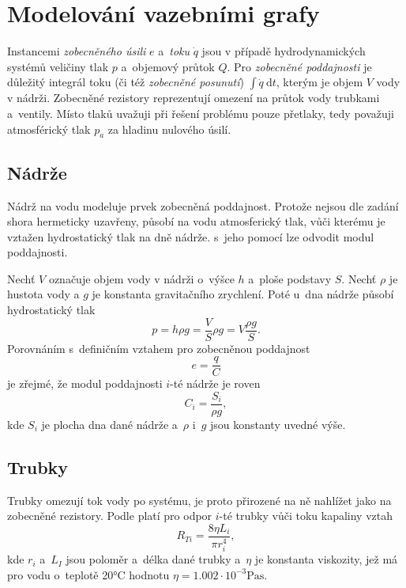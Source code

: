 \documentclass[conference]{IEEEtran}
\begin{document}
\section{Modelování vazebními grafy}

Instancemi \textit{zobecněného úsili} $e$ a~\textit{toku} $\dot{q}$ jsou v případě hydrodynamických systémů veličiny tlak $p$ a~objemový průtok $Q$.
Pro \textit{zobecněné poddajnosti} je důležitý integrál toku (či též \textit{zobecněné posunutí}) $\int \dot{q}~\text{d}t$,
kterým je objem $V$ vody v nádrži. Zobecněné rezistory reprezentují omezení na průtok vody trubkami a~ventily.
Místo tlaků uvažuji při řešení problému pouze přetlaky, tedy považuji atmosférický tlak $p_a$ za hladinu nulového úsilí.

\subsection{Nádrže}

Nádrž na vodu modeluje prvek zobecněná poddajnost. Protože nejsou dle zadání shora hermeticky uzavřeny, působí
na vodu atmosferický tlak, vůči kterému je vztažen hydrostatický tlak na dně nádrže. s~jeho pomocí lze odvodit modul poddajnosti.

Nechť $V$ označuje objem vody v nádrži o~výšce $h$ a~ploše podstavy $S$. Nechť $\rho$ je hustota vody
a $g$ je konstanta gravitačního zrychlení. Poté u~dna nádrže působí hydrostatický tlak
\begin{equation}
    p = h \rho g = \frac{V}{S} \rho g = V \frac{\rho g}{S}.
\end{equation}
Porovnáním s~definičním vztahem pro zobecněnou poddajnost
\begin{equation}
    e = \frac{q}{C}
\end{equation}
je zřejmé, že modul poddajnosti $i$-té nádrže je roven
\begin{equation}
    C_i = \frac{S_i}{\rho g},
    \label{eq:poddajnost}
\end{equation}
kde $S_i$ je plocha dna dané nádrže a~$\rho$ i~$g$ jsou konstanty uvedné výše.

\subsection{Trubky}

Trubky omezují tok vody po systému, je proto přirozené na ně nahlížet jako na zobecněné rezistory.
Podle \cite{odpor_trubky} platí pro odpor $i$-té trubky vůči toku kapaliny vztah
\begin{equation}
    R_{Ti} = \frac{8\eta L_i}{\pi r_i^4},
    \label{eq:odpor_trubky}
\end{equation}
kde $r_i$ a~$L_I$ jsou poloměr a~délka dané trubky a~$\eta$ je konstanta viskozity,
jež má pro vodu o~teplotě 20°C hodnotu $\eta = 1.002 \cdot 10^{-3} \si{\pascal \second}$.
\end{document}
